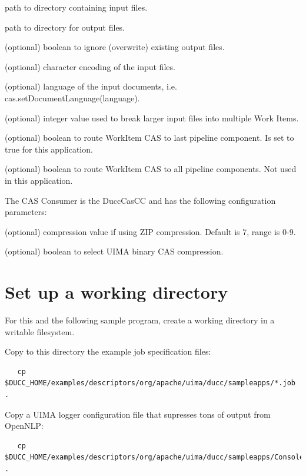 \begin{description}[labelindent=0.5in,leftmargin=0.5in]
    \item[InputDirectory] path to directory containing input files.
    \item[OutputDirectory] path to directory for output files.
    \item[IgnorePreviousOutput] (optional) boolean to ignore (overwrite) existing output files.
    \item[Encoding] (optional) character encoding of the input files.
    \item[Language] (optional) language of the input documents, i.e. cas.setDocumentLanguage(language).
    \item[BlockSize] (optional) integer value used to break larger input files into multiple Work Items.
    \item[SendToLast] (optional) boolean to route WorkItem CAS to last pipeline component. Is set to true for this application.
    \item[SendToAll] (optional) boolean to route WorkItem CAS to all pipeline components. Not used in this application.
\end{description}

The CAS Consumer is the DuccCasCC and has the following configuration parameters:

\begin{description}[labelindent=0.5in,leftmargin=0.5in]
  \item[XmiCompressionLevel] (optional) compression value if using ZIP compression. Default is 7, range is 0-9.
  \item[UseBinaryCompression] (optional) boolean to select UIMA binary CAS compression.
\end{description}

\section{Set up a working directory}
For this and the following sample program, create a working directory in a writable filesystem.

Copy to this directory the example job specification files:
\begin{verbatim}
   cp $DUCC_HOME/examples/descriptors/org/apache/uima/ducc/sampleapps/*.job .
\end{verbatim}

Copy a UIMA logger configuration file that supresses tons of output from OpenNLP:
\begin{verbatim}
   cp $DUCC_HOME/examples/descriptors/org/apache/uima/ducc/sampleapps/ConsoleLogger.properties .
\end{verbatim}

